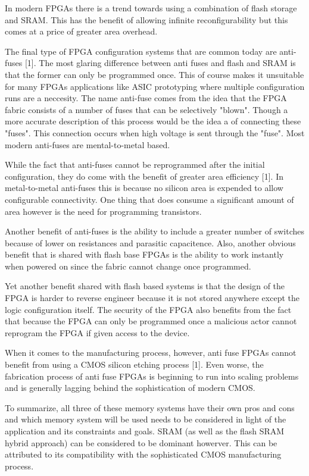 \documentclass{article}
\begin{document}
    In modern FPGAs there is a trend towards using a combination of flash storage and SRAM.
    This has the benefit of allowing infinite reconfigurability but this comes at a price
    of greater area overhead.

    The final type of FPGA configuration systems that are common today are anti-fuses [1].
    The most glaring difference between anti fuses and flash and SRAM is that the former
    can only be programmed once. This of course makes it unsuitable for many FPGAs applications
    like ASIC prototyping where multiple configuration runs are a neccesity.
    The name anti-fuse comes from the idea that the FPGA fabric consists of a number of fuses
    that can be selectively "blown". Though a more accurate description of this process
    would be the idea a of connecting these "fuses". This connection occurs when high voltage
    is sent through the "fuse". Most modern anti-fuses are mental-to-metal based.

    While the fact that anti-fuses cannot be reprogrammed after the initial configuration,
    they do come with the benefit of greater area efficiency [1]. In metal-to-metal
    anti-fuses this is because no silicon area is expended to allow configurable connectivity.
    One thing that does consume a significant amount of area however is the need for
    programming transistors.

    Another benefit of anti-fuses is the ability to include a greater number of switches
    because of lower on resistances and parasitic capacitence. Also,
    another obvious benefit that is shared with flash base FPGAs is the ability to
    work instantly when powered on since the fabric cannot change once programmed.

    Yet another benefit shared with flash based systems is that the design
    of the FPGA is harder to reverse engineer because it is not stored anywhere except
    the logic configuration itself. The security of the FPGA also benefits from the
    fact that because the FPGA can only be programmed once a malicious actor
    cannot reprogram the FPGA if given access to the device.

    When it comes to the manufacturing process, however, anti fuse FPGAs cannot
    benefit from using a CMOS silicon etching process [1]. Even worse,
    the fabrication process of anti fuse FPGAs is beginning to run into scaling problems
    and is generally lagging behind the sophistication of modern CMOS.

    To summarize, all three of these memory systems have their own pros and cons and
    which memory system will be used needs to be considered in light of the application
    and its constraints and goals. SRAM (as well as the flash SRAM hybrid approach) can
    be considered to be dominant howerver. This can be attributed to its compatibility
    with the sophisticated CMOS manufacturing process.
    
\end{document}
